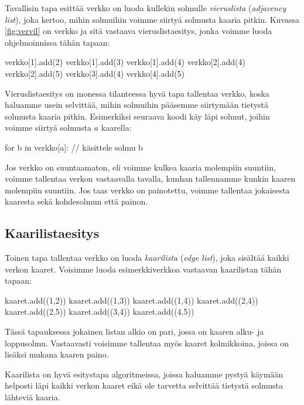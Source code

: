 Tavallisin tapa esittää verkko on luoda kullekin solmulle
\emph{vieruslista} (\emph{adjacency list}), joka kertoo, mihin solmuihin voimme
siirtyä solmusta kaaria pitkin.
Kuvassa \ref{fig:vervil} on verkko
ja sitä vastaava vieruslistaesitys,
jonka voimme luoda ohjelmoinnissa tähän tapaan:

\begin{code}
verkko[1].add(2)
verkko[1].add(3)
verkko[1].add(4)
verkko[2].add(4)
verkko[2].add(5)
verkko[3].add(4)
verkko[4].add(5)
\end{code}

Vieruslistaesitys on monessa tilanteessa hyvä tapa tallentaa verkko,
koska haluamme usein selvittää,
mihin solmuihin pääsemme siirtymään tietystä solmusta kaaria pitkin.
Esimerkiksi seuraava koodi käy läpi solmut,
joihin voimme siirtyä solmusta $a$ kaarella:

\begin{code}
for b in verkko[a]:
    // käsittele solmu b
\end{code}

Jos verkko on suuntaamaton, eli voimme kulkea kaaria molempiin suuntiin,
voimme tallentaa verkon vastaavalla tavalla,
kunhan tallennamme kunkin kaaren molempiin suuntiin.
Jos taas verkko on painotettu, voimme tallentaa jokaisesta
kaaresta sekä kohdesolmun että painon.

\subsection{Kaarilistaesitys}


Toinen tapa tallentaa verkko on luoda \emph{kaarilista}
(\emph{edge list}),
joka sisältää kaikki verkon kaaret.
Voisimme luoda esimerkkiverkkoa vastaavan kaarilistan
tähän tapaan:

\begin{code}
kaaret.add((1,2))
kaaret.add((1,3))
kaaret.add((1,4))
kaaret.add((2,4))
kaaret.add((2,5))
kaaret.add((3,4))
kaaret.add((4,5))
\end{code}

Tässä tapauksessa jokainen listan alkio on pari,
jossa on kaaren alku- ja loppusolmu.
Vastaavasti voisimme tallentaa myös kaaret kolmikkoina,
joissa on lisäksi mukana kaaren paino.

Kaarilista on hyvä esitystapa algoritmeissa,
joissa haluamme pystyä käy\-mään helposti läpi
kaikki verkon kaaret eikä ole tarvetta
selvittää tietystä solmusta lähteviä kaaria.

